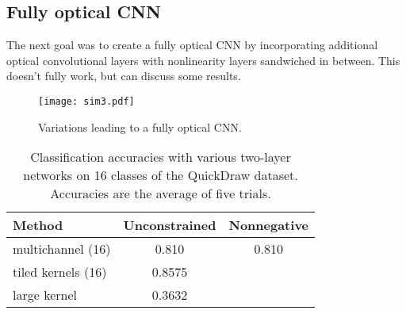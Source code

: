 
\subsection*{Fully optical CNN} 

The next goal was to create a fully optical CNN by incorporating additional optical convolutional layers with nonlinearity layers sandwiched in between. This doesn’t fully work, but can discuss some results.

\begin{figure}
\centering
\texttt{[image: sim3.pdf]}
\caption{Variations leading to a fully optical CNN.}
\label{fig:prototype}
\end{figure}


\setlength{\tabcolsep}{4pt}
\begin{table}
\begin{center}
\caption{Classification accuracies with various two-layer networks on 16 classes of the QuickDraw dataset. Accuracies are the average of five trials.}
\label{table:fullyoptical}
\begin{tabular}{ l | c | c  } 
 \textbf{Method} &  \textbf{Unconstrained} &  \textbf{Nonnegative}  \\ \hline 
multichannel (16)				& 0.810 & 0.810 \\
tiled kernels (16) 	& 0.8575	 & \\
large kernel	 & 0.3632	 & \\
\end{tabular}
\end{center}
\end{table}
\setlength{\tabcolsep}{1.4pt}